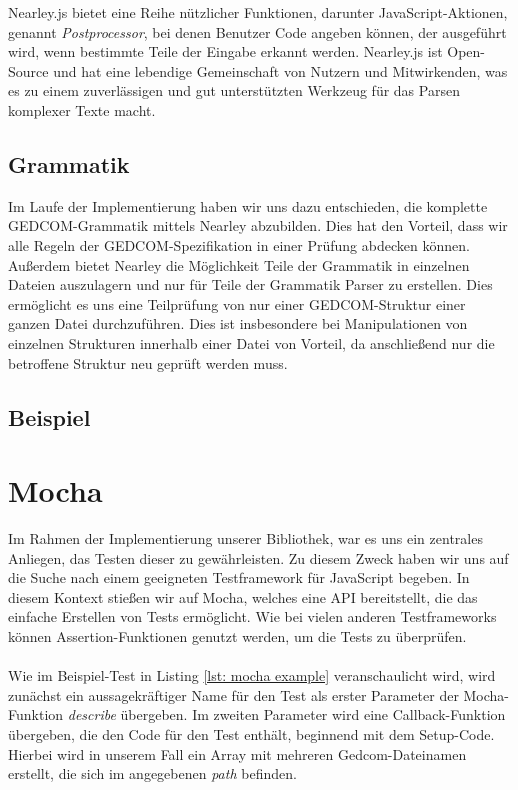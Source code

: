 Nearley.js bietet eine Reihe nützlicher Funktionen, darunter JavaScript-Aktionen, genannt \textit{Postprocessor}, bei denen Benutzer Code angeben können, 
der ausgeführt wird, wenn bestimmte Teile der Eingabe erkannt werden. Nearley.js ist Open-Source und hat eine lebendige Gemeinschaft von Nutzern und 
Mitwirkenden, was es zu einem zuverlässigen und gut unterstützten Werkzeug für das Parsen komplexer Texte macht.

\subsection*{Grammatik}
Im Laufe der Implementierung haben wir uns dazu entschieden, die komplette GEDCOM-Grammatik mittels Nearley abzubilden. Dies hat den Vorteil, dass wir 
alle Regeln der GEDCOM-Spezifikation in einer Prüfung abdecken können. Außerdem bietet Nearley die Möglichkeit Teile der Grammatik in einzelnen Dateien
auszulagern und nur für Teile der Grammatik Parser zu erstellen. Dies ermöglicht es uns eine Teilprüfung von nur einer GEDCOM-Struktur einer
ganzen Datei durchzuführen. Dies ist insbesondere bei Manipulationen von einzelnen Strukturen innerhalb einer Datei von Vorteil, da anschließend
nur die betroffene Struktur neu geprüft werden muss.

\subsection*{Beispiel}


\section{Mocha}
\label{sec: Mocha}

Im Rahmen der Implementierung unserer Bibliothek, war es uns ein zentrales Anliegen, das Testen dieser zu gewährleisten. Zu diesem Zweck haben wir uns 
auf die Suche nach einem geeigneten Testframework für JavaScript begeben. In diesem Kontext stießen wir auf Mocha, welches eine API bereitstellt, die
 das einfache Erstellen von Tests ermöglicht. Wie bei vielen anderen Testframeworks können Assertion-Funktionen genutzt werden, um die Tests zu überprüfen.
\\\\
Wie im Beispiel-Test in Listing \ref{lst: mocha example} veranschaulicht wird, wird zunächst ein aussagekräftiger Name für den Test als erster Parameter
 der Mocha-Funktion \textit{describe} übergeben. Im zweiten Parameter wird eine Callback-Funktion übergeben, die den Code für den Test enthält, beginnend
  mit dem Setup-Code. Hierbei wird in unserem Fall ein Array mit mehreren Gedcom-Dateinamen erstellt, die sich im angegebenen \textit{path} befinden.

